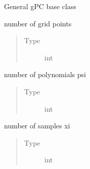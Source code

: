 \documentclass[letterpaper,10pt,english,openany,oneside]{sphinxmanual}
\begin{document}
\begin{fulllineitems}
\label{\detokenize{pygpc:pygpc.gpc.gPC}}
General gPC base class

\begin{fulllineitems}
\label{\detokenize{pygpc:pygpc.gpc.gPC.N_grid}}
number of grid points
\begin{quote}\begin{description}
\item[{Type}] \leavevmode
int

\end{description}\end{quote}

\end{fulllineitems}


\begin{fulllineitems}
\label{\detokenize{pygpc:pygpc.gpc.gPC.N_poly}}
number of polynomials psi
\begin{quote}\begin{description}
\item[{Type}] \leavevmode
int

\end{description}\end{quote}

\end{fulllineitems}


\begin{fulllineitems}
\label{\detokenize{pygpc:pygpc.gpc.gPC.N_samples}}
number of samples xi
\begin{quote}\begin{description}
\item[{Type}] \leavevmode
int

\end{description}\end{quote}

\end{fulllineitems}



\end{fulllineitems}
\end{document}
